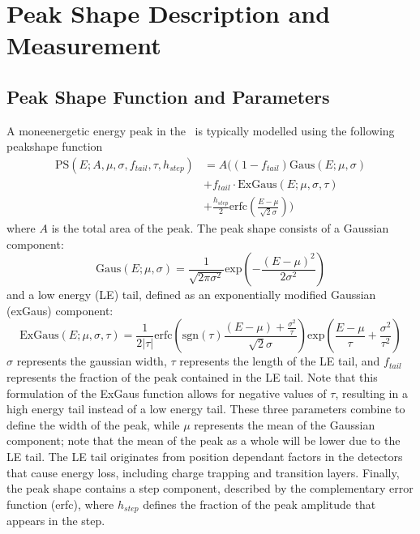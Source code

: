 \documentclass[/main.tex]{subfiles}
\begin{document}
\onlyinsubfile{\appendix}
\chapter{Peak Shape Description and Measurement} \label{app:peakshape}

\section{Peak Shape Function and Parameters}
A moneenergetic energy peak in the \MJD\ is typically modelled using the following peakshape function
\begin{equation} \label{eq:peakshape}
  \begin{aligned}
    \mathrm{PS}(E; A, \mu, \sigma, f_{tail}, \tau, h_{step}) &= A\big((1-f_{tail})\mathrm{Gaus}(E; \mu, \sigma) \\&+ f_{tail}\cdot\mathrm{ExGaus}(E; \mu, \sigma, \tau) \\&+ \frac{h_{step}}{2}\mathrm{erfc}(\frac{E-\mu}{\sqrt{2}\sigma})\big)
  \end{aligned}
\end{equation}
where $A$ is the total area of the peak.
The peak shape consists of a Gaussian component:
\begin{equation}
  \mathrm{Gaus}(E; \mu, \sigma) = \frac{1}{\sqrt{2\pi\sigma^2}}\mathrm{exp}(-\frac{(E-\mu)^2}{2\sigma^2})
\end{equation}
and a low energy (LE) tail, defined as an exponentially modified Gaussian (exGaus) component:
\begin{equation}
  \mathrm{ExGaus}(E; \mu, \sigma, \tau) = \frac{1}{2|\tau|} \mathrm{erfc}(\mathrm{sgn}(\tau)\frac{(E-\mu) + \frac{\sigma^2}{\tau}}{\sqrt{2}\sigma})\mathrm{exp}(\frac{E-\mu}{\tau}+\frac{\sigma^2}{\tau^2})
\end{equation}
$\sigma$ represents the gaussian width, $\tau$ represents the length of the LE tail, and $f_{tail}$ represents the fraction of the peak contained in the LE tail.
Note that this formulation of the ExGaus function allows for negative values of $\tau$, resulting in a high energy tail instead of a low energy tail.
These three parameters combine to define the width of the peak, while $\mu$ represents the mean of the Gaussian component; note that the mean of the peak as a whole will be lower due to the LE tail.
The LE tail originates from position dependant factors in the detectors that cause energy loss, including charge trapping and transition layers.
Finally, the peak shape contains a step component, described by the complementary error function (erfc), where $h_{step}$ defines the fraction of the peak amplitude that appears in the step.
\end{document}
